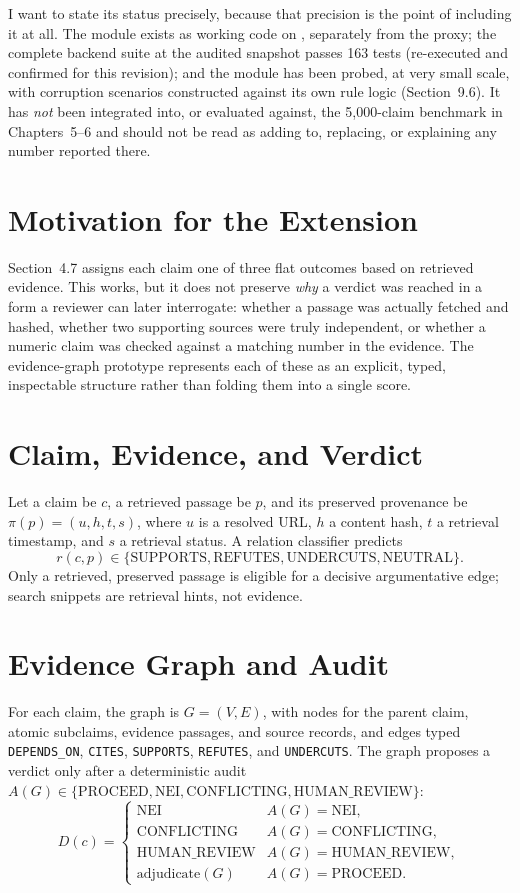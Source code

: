 \documentclass[12pt,a4paper,openany]{report}
\begin{document}
I want to state its status precisely, because that precision is the point of including it at all. The module exists as working code on , separately from the proxy; the complete backend suite at the audited snapshot passes 163 tests (re-executed and confirmed for this revision); and the module has been probed, at very small scale, with corruption scenarios constructed against its own rule logic (Section~9.6). It has \emph{not} been integrated into, or evaluated against, the 5{,}000-claim benchmark in Chapters~5--6 and should not be read as adding to, replacing, or explaining any number reported there.

\section{Motivation for the Extension}
Section~4.7 assigns each claim one of three flat outcomes based on retrieved evidence. This works, but it does not preserve \emph{why} a verdict was reached in a form a reviewer can later interrogate: whether a passage was actually fetched and hashed, whether two supporting sources were truly independent, or whether a numeric claim was checked against a matching number in the evidence. The evidence-graph prototype represents each of these as an explicit, typed, inspectable structure rather than folding them into a single score.

\section{Claim, Evidence, and Verdict}
Let a claim be $c$, a retrieved passage be $p$, and its preserved provenance be $\pi(p) = (u, h, t, s)$, where $u$ is a resolved URL, $h$ a content hash, $t$ a retrieval timestamp, and $s$ a retrieval status. A relation classifier predicts
\[
r(c,p) \in \{\mathrm{SUPPORTS}, \mathrm{REFUTES}, \mathrm{UNDERCUTS}, \mathrm{NEUTRAL}\}.
\]
Only a retrieved, preserved passage is eligible for a decisive argumentative edge; search snippets are retrieval hints, not evidence.

\section{Evidence Graph and Audit}
For each claim, the graph is $G=(V,E)$, with nodes for the parent claim, atomic subclaims, evidence passages, and source records, and edges typed \texttt{DEPENDS\_ON}, \texttt{CITES}, \texttt{SUPPORTS}, \texttt{REFUTES}, and \texttt{UNDERCUTS}. The graph proposes a verdict only after a deterministic audit $A(G) \in \{\mathrm{PROCEED}, \mathrm{NEI}, \mathrm{CONFLICTING}, \mathrm{HUMAN\_REVIEW}\}$:
\[
D(c) = \begin{cases}
\mathrm{NEI} & A(G)=\mathrm{NEI},\\
\mathrm{CONFLICTING} & A(G)=\mathrm{CONFLICTING},\\
\mathrm{HUMAN\_REVIEW} & A(G)=\mathrm{HUMAN\_REVIEW},\\
\mathrm{adjudicate}(G) & A(G)=\mathrm{PROCEED}.
\end{cases}
\]
\end{document}
